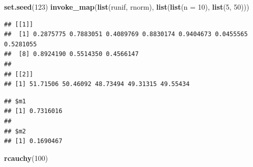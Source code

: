 \documentclass[]{book}
\newenvironment{Shaded}{\begin{snugshade}}{\end{snugshade}}
\newcommand{\DataTypeTok}[1]{\textcolor[rgb]{0.13,0.29,0.53}{#1}}
\newcommand{\DecValTok}[1]{\textcolor[rgb]{0.00,0.00,0.81}{#1}}
\newcommand{\KeywordTok}[1]{\textcolor[rgb]{0.13,0.29,0.53}{\textbf{#1}}}
\newcommand{\NormalTok}[1]{#1}
\newcommand{\OperatorTok}[1]{\textcolor[rgb]{0.81,0.36,0.00}{\textbf{#1}}}
\newcommand{\StringTok}[1]{\textcolor[rgb]{0.31,0.60,0.02}{#1}}
\theoremstyle{definition}
\theoremstyle{definition}
\theoremstyle{definition}
\theoremstyle{remark}
\begin{document}
\begin{Shaded}
\begin{Highlighting}[]
\KeywordTok{set.seed}\NormalTok{(}\DecValTok{123}\NormalTok{)}
\KeywordTok{invoke_map}\NormalTok{(}\KeywordTok{list}\NormalTok{(runif, rnorm), }\KeywordTok{list}\NormalTok{(}\KeywordTok{list}\NormalTok{(}\DataTypeTok{n =} \DecValTok{10}\NormalTok{), }\KeywordTok{list}\NormalTok{(}\DecValTok{5}\NormalTok{, }\DecValTok{50}\NormalTok{)))}
\end{Highlighting}
\end{Shaded}

\begin{verbatim}
## [[1]]
##  [1] 0.2875775 0.7883051 0.4089769 0.8830174 0.9404673 0.0455565 0.5281055
##  [8] 0.8924190 0.5514350 0.4566147
## 
## [[2]]
## [1] 51.71506 50.46092 48.73494 49.31315 49.55434
\end{verbatim}

\begin{Shaded}
\end{Shaded}

\begin{verbatim}
## $m1
## [1] 0.7316016
## 
## $m2
## [1] 0.1690467
\end{verbatim}

\begin{Shaded}
\begin{Highlighting}[]
\KeywordTok{rcauchy}\NormalTok{(}\DecValTok{100}\NormalTok{)}
\end{Highlighting}
\end{Shaded}
\end{document}
